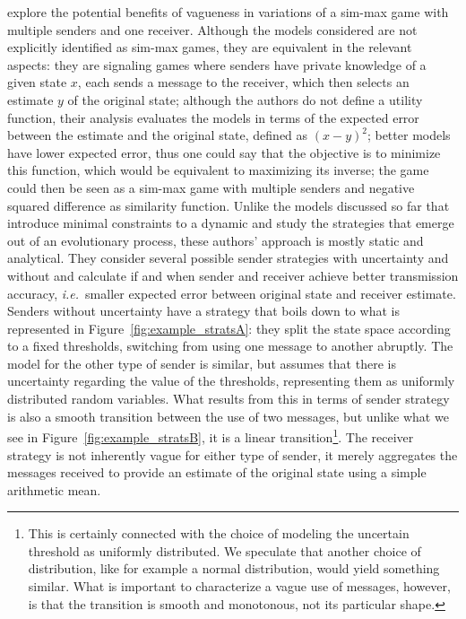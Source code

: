 \documentclass[a4paper]{article}
\begin{document}
\textcite{lawry_vagueness_2017} explore the potential benefits of vagueness in variations of a sim-max game with multiple senders and one receiver.
Although the models considered are not explicitly identified as sim-max games, they are equivalent in the relevant aspects: they are signaling games where senders have private knowledge of a given state $x$, each sends a message to the receiver, which then selects an estimate $y$ of the original state; although the authors do not define a utility function, their analysis evaluates the models in terms of the expected error between the estimate and the original state, defined as $(x-y)^2$; better models have lower expected error, thus one could say that the objective is to minimize this function, which would be equivalent to maximizing its inverse; the game could then be seen as a sim-max game with multiple senders and negative squared difference as similarity function.
Unlike the models discussed so far that introduce minimal constraints to a dynamic and study the strategies that emerge out of an evolutionary process, these authors' approach is mostly static and analytical.
They consider several possible sender strategies with uncertainty and without and calculate if and when sender and receiver achieve better transmission accuracy, \emph{i.e.}~smaller expected error between original state and receiver estimate.
Senders without uncertainty have a strategy that boils down to what is represented in Figure~\ref{fig:example_stratsA}: they split the state space according to a fixed thresholds, switching from using one message to another abruptly.
The model for the other type of sender is similar, but assumes that there is uncertainty regarding the value of the thresholds, representing them as uniformly distributed random variables.
What results from this in terms of sender strategy is also a smooth transition between the use of two messages, but unlike what we see in Figure~\ref{fig:example_stratsB}, it is a linear transition\footnote{This is certainly connected with the choice of modeling the uncertain threshold as uniformly distributed. We speculate that another choice of distribution, like for example a normal distribution, would yield something similar. What is important to characterize a vague use of messages, however, is that the transition is smooth and monotonous, not its particular shape.}.
The receiver strategy is not inherently vague for either type of sender, it merely aggregates the messages received to provide an estimate of the original state using a simple arithmetic mean.
\end{document}
